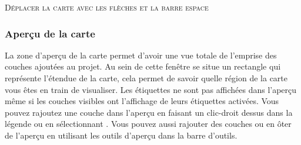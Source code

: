 
\begin{Astuce}\caption{\textsc{Déplacer la carte avec les flèches et la barre espace}}
\end{Astuce}

%
%

\subsubsection{Aperçu de la carte}\label{label_mapoverview}

La zone d'aperçu de la carte permet d'avoir une vue totale de l'emprise des couches ajoutées au projet. Au sein de cette fenêtre se situe un rectangle qui représente l'étendue de la carte, cela permet de savoir quelle région de la carte vous êtes en train de visualiser. Les étiquettes ne sont pas affichées dans l'aperçu même si les couches visibles ont l'affichage de leurs étiquettes activées.
Vous pouvez rajoutez une couche dans l'aperçu en faisant un clic-droit dessus dans la légende ou en sélectionnant . Vous pouvez aussi rajouter des couches ou en ôter de l'aperçu en utilisant les outils d'aperçu dans la barre d'outils.

